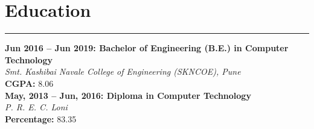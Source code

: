 \documentclass[11pt,a4paper]{article}
\newcommand{\blueitem}[1]{\textcolor{subtitleblue}{\textbf{#1}}}
\begin{document}
 




\vspace{0.3cm}
\section*{Education}
\hrule
\vspace{0.2cm}





\blueitem{Jun 2016 -- Jun 2019: Bachelor of Engineering (B.E.) in Computer Technology } \\
\textit{Smt. Kashibai Navale College of Engineering (SKNCOE), Pune} \\
\textbf{CGPA:} 8.06 \\

\blueitem{May, 2013 -- Jun, 2016: Diploma in Computer Technology} \\
\textit{P. R. E. C. Loni} \\
\textbf{Percentage:} 83.35%
\end{document}
